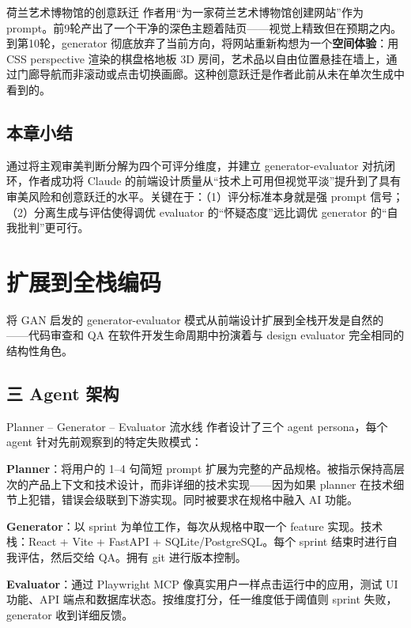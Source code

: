 \documentclass[a4paper]{article}
\begin{document}
\begin{knowledgebox}{荷兰艺术博物馆的创意跃迁}
作者用``为一家荷兰艺术博物馆创建网站''作为 prompt。前9轮产出了一个干净的深色主题着陆页——视觉上精致但在预期之内。到第10轮，generator 彻底放弃了当前方向，将网站重新构想为一个\textbf{空间体验}：用 CSS perspective 渲染的棋盘格地板 3D 房间，艺术品以自由位置悬挂在墙上，通过门廊导航而非滚动或点击切换画廊。这种创意跃迁是作者此前从未在单次生成中看到的。
\end{knowledgebox}

\subsection{本章小结}

通过将主观审美判断分解为四个可评分维度，并建立 generator-evaluator 对抗闭环，作者成功将 Claude 的前端设计质量从``技术上可用但视觉平淡''提升到了具有审美风险和创意跃迁的水平。关键在于：（1）评分标准本身就是强 prompt 信号；（2）分离生成与评估使得调优 evaluator 的``怀疑态度''远比调优 generator 的``自我批判''更可行。

\section{扩展到全栈编码}

将 GAN 启发的 generator-evaluator 模式从前端设计扩展到全栈开发是自然的——代码审查和 QA 在软件开发生命周期中扮演着与 design evaluator 完全相同的结构性角色。

\subsection{三 Agent 架构}

\begin{importantbox}{Planner -- Generator -- Evaluator 流水线}
作者设计了三个 agent persona，每个 agent 针对先前观察到的特定失败模式：

\textbf{Planner}：将用户的 1--4 句简短 prompt 扩展为完整的产品规格。被指示保持高层次的产品上下文和技术设计，而非详细的技术实现——因为如果 planner 在技术细节上犯错，错误会级联到下游实现。同时被要求在规格中融入 AI 功能。

\textbf{Generator}：以 sprint 为单位工作，每次从规格中取一个 feature 实现。技术栈：React + Vite + FastAPI + SQLite/PostgreSQL。每个 sprint 结束时进行自我评估，然后交给 QA。拥有 git 进行版本控制。

\textbf{Evaluator}：通过 Playwright MCP 像真实用户一样点击运行中的应用，测试 UI 功能、API 端点和数据库状态。按维度打分，任一维度低于阈值则 sprint 失败，generator 收到详细反馈。
\end{importantbox}
\end{document}

